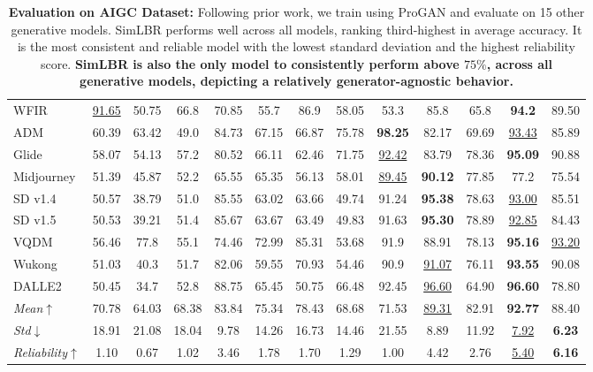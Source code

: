 \begin{table}[]
{\begin{tabular}{l|ccccccccccc|c}
WFIR                                                        & \underline{91.65}   & 50.75   & 66.8   & 70.85 & 55.7  & 86.9   & 58.05  & 53.3   & 85.8       & 65.8  & \textbf{94.2}  & 89.50  \\
ADM                                                         & 60.39   & 63.42   & 49.0   & 84.73 & 67.15 & 66.87  & 75.78  & \textbf{ 98.25}  & 82.17      & 69.69 & \underline{93.43} & 85.89  \\
Glide      & 58.07   & 54.13   & 57.2   & 80.52 & 66.11 & 62.46  & 71.75  & \underline{92.42}  & 83.79      & 78.36 & \textbf{95.09} & 90.88  \\
Midjourney                                                  & 51.39   & 45.87   & 52.2   & 65.55 & 65.35 & 56.13  & 58.01  & \underline{89.45}  & \textbf{90.12}      & 77.85 & 77.2  & 75.54  \\
SD v1.4                                                     & 50.57   & 38.79   & 51.0   & 85.55 & 63.02 & 63.66  & 49.74  & 91.24  & \textbf{95.38}      & 78.63 & \underline{93.00}  & 85.51  \\
SD v1.5                                                     & 50.53   & 39.21   & 51.4   & 85.67 & 63.67 & 63.49  & 49.83  & 91.63  & \textbf{95.30}       & 78.89 & \underline{92.85} & 84.43   \\
VQDM                                                        & 56.46   & 77.8    & 55.1   & 74.46 & 72.99 & 85.31  & 53.68  & 91.9   & 88.91      & 78.13 & \textbf{95.16} & \underline{93.20}  \\
Wukong                     & 51.03   & 40.3    & 51.7   & 82.06 & 59.55 & 70.93  & 54.46  & 90.9   & \underline{91.07}      & 76.11 & \textbf{93.55} & 90.08  \\
DALLE2                                                      & 50.45   & 34.7    & 52.8   & 88.75 & 65.45 & 50.75  & 66.48  & 92.45  & \underline{96.60}       & 64.90  & \textbf{96.60 } & 78.80  \\
\hline
\textit{Mean}$\uparrow$                                                        & 70.78   & 64.03   & 68.38  & 83.84 & 75.34 & 78.43  & 68.68  & 71.53  & \underline{89.31}      & 82.91 & \textbf{92.77} & 88.40  \\

\textit{Std}$\downarrow$                  & 18.91   & 21.08   & 18.04  & 9.78  & 14.26 & 16.73  & 14.46  & 21.55  & 8.89  & 11.92 & \underline{7.92}  & \textbf{6.23} \\
\textit{Reliability}$\uparrow$   & 1.10  & 0.67   & 1.02  & 3.46  & 1.78 & 1.70  & 1.29  & 1.00  & 4.42  & 2.76 & \underline{5.40}  & \textbf{6.16} 
\end{tabular}
}
\caption{\textbf{Evaluation on AIGC Dataset: }Following prior work, we train using ProGAN and evaluate on 15 other generative models. SimLBR performs well across all models, ranking third-highest in average accuracy. It is the most consistent and reliable model with the lowest standard deviation and the highest reliability score. \textbf{SimLBR is also the only model to consistently perform above $75\%$, across all generative models, depicting a relatively generator-agnostic behavior.}} 
\label{table:aigc}
\end{table}
